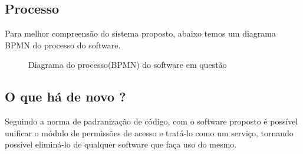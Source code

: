 \subsection{Processo}


Para melhor compreensão do sistema proposto, abaixo temos um diagrama BPMN do processo do software.


\begin{figure} %
	\vspace*{-2cm}
	\label{fig:diagramaBpmn}
	\caption{Diagrama do processo(BPMN) do software em questão}
\end{figure}


\subsection{O que há de novo ?} %


Seguindo a norma de padranização de código, com o software proposto é possível unificar o módulo de permissões de acesso e tratá-lo como um serviço, tornando possível eliminá-lo de qualquer software que faça uso do mesmo.